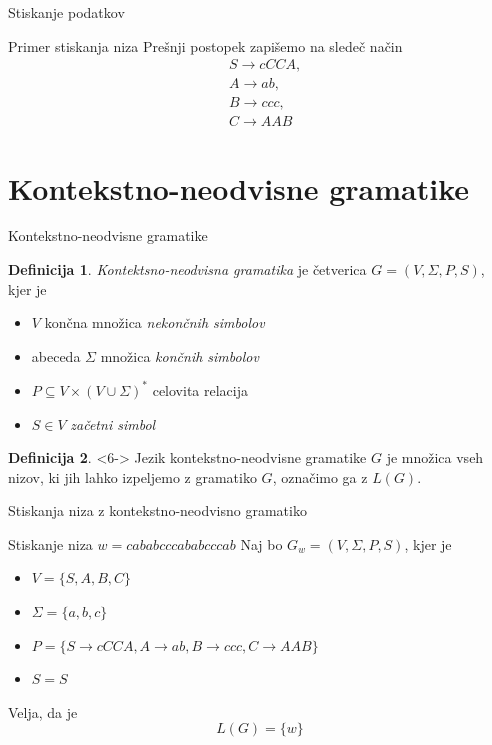 \documentclass{beamer}
\theoremstyle{definition} %
\newtheorem{definicija}{Definicija}[section]
\begin{document}
\begin{frame}{Stiskanje podatkov}
    \begin{exampleblock}{Primer stiskanja niza}
        Prešnji postopek zapišemo na sledeč način
        \begin{align*}
            & S  \rightarrow  \mathit{cCCA}, \\
            & A  \rightarrow  \mathit{ab}, \\
            & B  \rightarrow  \mathit{ccc}, \\
            & C  \rightarrow  \mathit{AAB}
        \end{align*}
    \end{exampleblock}
\end{frame}

\section*{Kontekstno-neodvisne gramatike}

\begin{frame}{Kontekstno-neodvisne gramatike}
    \begin{definicija}
        \textit{Kontektsno-neodvisna gramatika} je četverica $ G = ( V, \Sigma, P, S ) $, kjer je
        \begin{itemize}
            \item<2-> $ V $ končna množica \textit{nekončnih simbolov}
            \item<3-> abeceda $ \Sigma $ množica \textit{končnih simbolov}
            \item<4-> $ P \subseteq V \times ( V \cup \Sigma )^* $ celovita relacija
            \item<5-> $ S \in V $ \textit{začetni simbol}
        \end{itemize}
    \end{definicija}
    \begin{definicija}<6->
        Jezik kontekstno-neodvisne gramatike $ G $ je množica vseh nizov, ki jih lahko izpeljemo
        z gramatiko $ G $, označimo ga z $ L(G) $.
    \end{definicija}
\end{frame}

\begin{frame}{Stiskanja niza z kontekstno-neodvisno gramatiko}
    \begin{exampleblock}{Stiskanje niza $ w = \mathit{cababcccababcccab} $}
        Naj bo $ G_w = ( V, \Sigma, P, S ) $, kjer je 
        \begin{itemize}
            \item<2-> $ V = \{ S, A, B, C \} $
            \item<3-> $ \Sigma = \{ a, b, c \} $
            \item<4-> $ P = \{ S  \rightarrow  \mathit{cCCA}, A  \rightarrow  \mathit{ab}, B  
            \rightarrow  \mathit{ccc}, C  \rightarrow  \mathit{AAB} \} $
            \item<5-> $ S = S $
        \end{itemize}
        \pause
        Velja, da je 
        \[
            L(G) = \{ w \}
        \]
    \end{exampleblock}
\end{frame}
\end{document}
